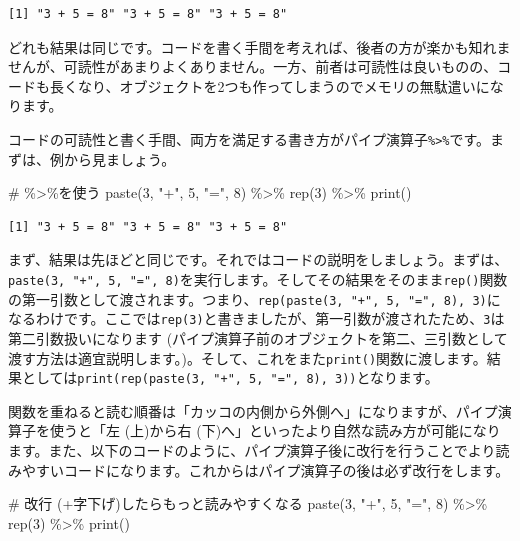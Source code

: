 \documentclass[
  a4paper,
  pandoc,
  ja=standard,
  jafont=haranoaji]{bxjsbook}
\newenvironment{Shaded}{\begin{snugshade}}{\end{snugshade}}
\newcommand{\CommentTok}[1]{\textcolor[rgb]{0.37,0.37,0.37}{#1}}
\newcommand{\DecValTok}[1]{\textcolor[rgb]{0.68,0.00,0.00}{#1}}
\newcommand{\FunctionTok}[1]{\textcolor[rgb]{0.28,0.35,0.67}{#1}}
\newcommand{\NormalTok}[1]{\textcolor[rgb]{0.00,0.48,0.65}{#1}}
\newcommand{\SpecialCharTok}[1]{\textcolor[rgb]{0.37,0.37,0.37}{#1}}
\newcommand{\StringTok}[1]{\textcolor[rgb]{0.13,0.47,0.30}{#1}}
\begin{document}
\begin{verbatim}
[1] "3 + 5 = 8" "3 + 5 = 8" "3 + 5 = 8"
\end{verbatim}

どれも結果は同じです。コードを書く手間を考えれば、後者の方が楽かも知れませんが、可読性があまりよくありません。一方、前者は可読性は良いものの、コードも長くなり、オブジェクトを2つも作ってしまうのでメモリの無駄遣いになります。

コードの可読性と書く手間、両方を満足する書き方がパイプ演算子\texttt{\%\textgreater{}\%}です。まずは、例から見ましょう。

\begin{Shaded}
\begin{Highlighting}[numbers=left,,]
\CommentTok{\# \%\textgreater{}\%を使う}
\FunctionTok{paste}\NormalTok{(}\DecValTok{3}\NormalTok{, }\StringTok{"+"}\NormalTok{, }\DecValTok{5}\NormalTok{, }\StringTok{"="}\NormalTok{, }\DecValTok{8}\NormalTok{) }\SpecialCharTok{\%\textgreater{}\%} \FunctionTok{rep}\NormalTok{(}\DecValTok{3}\NormalTok{) }\SpecialCharTok{\%\textgreater{}\%} \FunctionTok{print}\NormalTok{()}
\end{Highlighting}
\end{Shaded}

\begin{verbatim}
[1] "3 + 5 = 8" "3 + 5 = 8" "3 + 5 = 8"
\end{verbatim}

まず、結果は先ほどと同じです。それではコードの説明をしましょう。まずは、\texttt{paste(3,\ "+",\ 5,\ "=",\ 8)}を実行します。そしてその結果をそのまま\texttt{rep()}関数の第一引数として渡されます。つまり、\texttt{rep(paste(3,\ "+",\ 5,\ "=",\ 8),\ 3)}になるわけです。ここでは\texttt{rep(3)}と書きましたが、第一引数が渡されたため、\texttt{3}は第二引数扱いになります
(パイプ演算子前のオブジェクトを第二、三引数として渡す方法は適宜説明します。)。そして、これをまた\texttt{print()}関数に渡します。結果としては\texttt{print(rep(paste(3,\ "+",\ 5,\ "=",\ 8),\ 3))}となります。

関数を重ねると読む順番は「カッコの内側から外側へ」になりますが、パイプ演算子を使うと「左
(上)から右
(下)へ」といったより自然な読み方が可能になります。また、以下のコードのように、パイプ演算子後に改行を行うことでより読みやすいコードになります。これからはパイプ演算子の後は必ず改行をします。

\begin{Shaded}
\begin{Highlighting}[numbers=left,,]
\CommentTok{\# 改行 (+字下げ)したらもっと読みやすくなる}
\FunctionTok{paste}\NormalTok{(}\DecValTok{3}\NormalTok{, }\StringTok{"+"}\NormalTok{, }\DecValTok{5}\NormalTok{, }\StringTok{"="}\NormalTok{, }\DecValTok{8}\NormalTok{) }\SpecialCharTok{\%\textgreater{}\%} 
    \FunctionTok{rep}\NormalTok{(}\DecValTok{3}\NormalTok{) }\SpecialCharTok{\%\textgreater{}\%} 
    \FunctionTok{print}\NormalTok{()}
\end{Highlighting}
\end{Shaded}
\end{document}
